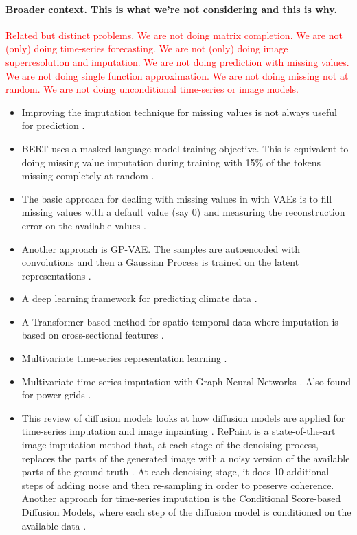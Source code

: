 \documentclass[a4paper,12pt,twoside,openright]{report}
\newcommand{\crit}[1]{\textcolor{red}{#1}}
\begin{document}
\paragraph{Broader context. This is what we're not considering and this is why.} \crit{Related but distinct problems. We are not doing matrix completion. We are not (only) doing time-series forecasting. We are not (only) doing image superresolution and imputation. We are not doing prediction with missing values. We are not doing single function approximation. We are not doing missing not at random. We are not doing unconditional time-series or image models.}

\begin{itemize}
    \item Improving the imputation technique for missing values is not always useful for prediction \parencite{lemorvanWhatGoodImputation2021}.
    \item BERT uses a masked language model training objective. This is equivalent to doing missing value imputation during training with 15\% of the tokens missing completely at random \parencite{devlinBERTPretrainingDeep2019}.
    \item The basic approach for dealing with missing values in with VAEs is to fill missing values with a default value (say 0) and measuring the reconstruction error on the available values \parencite{nazabalHandlingIncompleteHeterogeneous2020}.
    \item Another approach is GP-VAE. The samples are autoencoded with convolutions and then a Gaussian Process is trained on the latent representations \parencite{fortuinGPVAEDeepProbabilistic2020}.
    \item A deep learning framework for predicting climate data \parencite{amatoNovelFrameworkSpatiotemporal2020}.
    \item A Transformer based method for spatio-temporal data where imputation is based on cross-sectional features \parencite{maCDSACrossDimensionalSelfAttention2019}.
    \item Multivariate time-series representation learning \parencite{zerveasTransformerbasedFrameworkMultivariate2021}.
    \item Multivariate time-series imputation with Graph Neural Networks \parencite{ciniFillingApMultivariate2022}. Also found for power-grids \parencite{kuppannagariSpatioTemporalMissingData2021}.
    \item This review of diffusion models looks at how diffusion models are applied for time-series imputation and image inpainting \parencite{yangDiffusionModelsComprehensive2022}. RePaint is a state-of-the-art image imputation method that, at each stage of the denoising process, replaces the parts of the generated image with a noisy version of the available parts of the ground-truth \parencite{lugmayrRePaintInpaintingUsing2022}. At each denoising stage, it does 10 additional steps of adding noise and then re-sampling in order to preserve coherence. Another approach for time-series imputation is the Conditional Score-based Diffusion Models, where each step of the diffusion model is conditioned on the available data \parencite{tashiroCSDIConditionalScorebased2021}.

\end{itemize}
\end{document}
